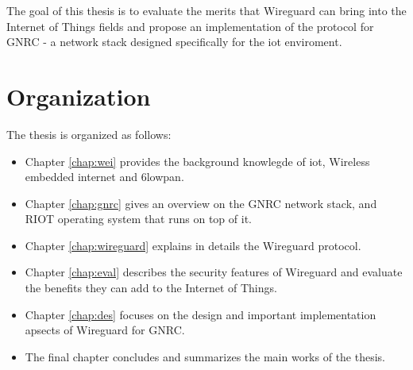   The goal of this thesis is to evaluate the merits that Wireguard can bring into the Internet
  of Things fields and propose an implementation of the protocol for GNRC - a network stack designed
  specifically for the \gls{iot} enviroment.

\section{Organization}
  The thesis is organized as follows:
  \begin{itemize}
    \item Chapter \ref{chap:wei} provides the background knowlegde of \gls{iot}, Wireless embedded internet and
    \gls{6lowpan}.
    \item Chapter \ref{chap:gnrc} gives an overview on the GNRC network stack, and RIOT operating
    system that runs on top of it.
    \item Chapter \ref{chap:wireguard} explains in details the Wireguard protocol.
    \item Chapter \ref{chap:eval} describes the security features of Wireguard and evaluate
    the benefits they can add to the Internet of Things.
    \item Chapter \ref{chap:des} focuses on the design and important implementation apsects of
    Wireguard for GNRC.
    \item The final chapter concludes and summarizes the main works of the thesis.
  \end{itemize}